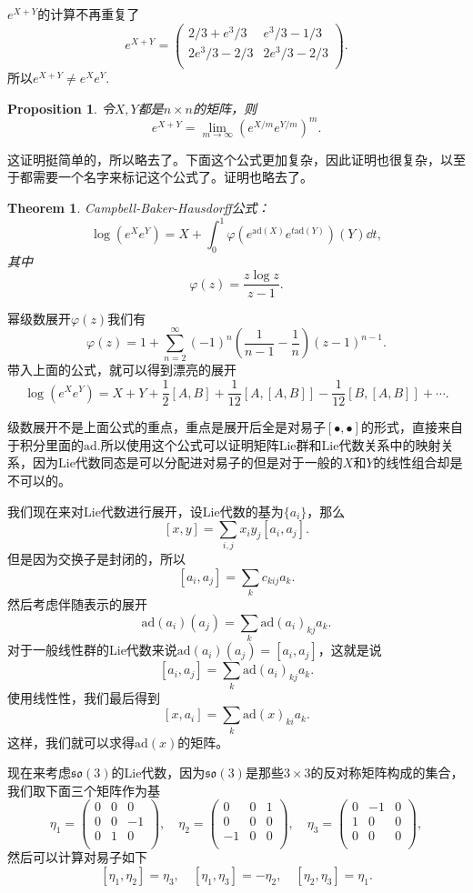 \documentclass[9pt]{extbook}
\theoremstyle{plain}
\newtheorem{pro}[defi]{Proposition}
\newtheorem{theo}[defi]{Theorem}
\newcommand{\ad}{{\mathrm{ad}}}
\begin{document}
$e^{X+Y}$的计算不再重复了
\[
e^{X+Y}=\begin{pmatrix}
 2/3+e^3/3 & e^3/3-1/3 \\
 2 e^3/3-2/3 & 2 e^3/3-2/3 \\
\end{pmatrix}.
\]
所以$e^{X+Y}\neq e^Xe^Y$.
\begin{pro}
令$X,Y$都是$n\times n$的矩阵，则
\[
	e^{X+Y}=\lim_{m\to\infty}\left(e^{X/m}e^{Y/m}\right)^m.
\]
\end{pro}
这证明挺简单的，所以略去了。下面这个公式更加复杂，因此证明也很复杂，以至于都需要一个名字来标记这个公式了。证明也略去了。
\begin{theo}
Campbell-Baker-Hausdorff公式：
\[
\log\left(e^Xe^Y\right)=X+\int_0^1 \varphi\left(e^{\ad(X)}e^{t\ad(Y)}\right)(Y)\dd t,
\]
其中
\[
\varphi(z)=\frac{z\log z}{z-1}.
\]
\end{theo}
幂级数展开$\varphi(z)$我们有
\[
	\varphi(z)=1+\sum_{n=2}^\infty (-1)^n\left(\frac{1}{n-1}-\frac{1}{n}\right)(z-1)^{n-1}.
\]
带入上面的公式，就可以得到漂亮的展开
\[
\log\left(e^Xe^Y\right)=X+Y+\frac{1}{2}[A,B]+\frac{1}{12}[A,[A,B]]-\frac{1}{12}[B,[A,B]]+\cdots.
\]

级数展开不是上面公式的重点，重点是展开后全是对易子$[\bullet,\bullet]$的形式，直接来自于积分里面的$\ad$.所以使用这个公式可以证明矩阵Lie群和Lie代数关系中的映射关系，因为Lie代数同态是可以分配进对易子的但是对于一般的$X$和$Y$的线性组合却是不可以的。

我们现在来对Lie代数进行展开，设Lie代数的基为$\{a_i\}$，那么
\[
[x,y]=\sum_{i,j}x_iy_j[a_i,a_j].
\]
但是因为交换子是封闭的，所以
\[
	[a_i,a_j]=\sum_k c_{kij}a_k.
\]
然后考虑伴随表示的展开
\[
	\ad(a_i)(a_j)=\sum_k \ad(a_i)_{kj}a_k.
\]
对于一般线性群的Lie代数来说$\ad(a_i)(a_j)=[a_i,a_j]$，这就是说
\[
	[a_i,a_j]=\sum_k \ad(a_i)_{kj}a_k.
\]
使用线性性，我们最后得到
\[
	[x,a_i]=\sum_k \ad(x)_{ki}a_k.
\]
这样，我们就可以求得$\ad(x)$的矩阵。

现在来考虑$\mathfrak{so}(3)$的Lie代数，因为$\mathfrak{so}(3)$是那些$3\times 3$的反对称矩阵构成的集合，我们取下面三个矩阵作为基
\[
	\eta_1=
		\begin{pmatrix}
			0&0&0\\
			0&0&-1\\
			0&1&0\\
		\end{pmatrix},\quad
	\eta_2=
		\begin{pmatrix}
			0&0&1\\
			0&0&0\\
			-1&0&0\\
		\end{pmatrix},\quad
	\eta_3=
		\begin{pmatrix}
			0&-1&0\\
			1&0&0\\
			0&0&0\\
		\end{pmatrix},
\]
然后可以计算对易子如下
\[
	[\eta_1,\eta_2]=\eta_3,\quad [\eta_1,\eta_3]=-\eta_2,\quad [\eta_2,\eta_3]=\eta_1.
\]
\end{document}
